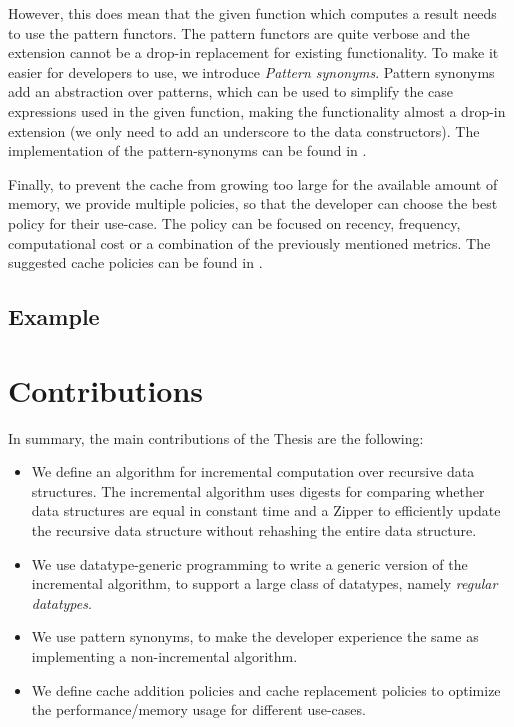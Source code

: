 However, this does mean that the given function which computes a result needs to use the pattern functors. The pattern functors are quite verbose and the extension cannot be a drop-in replacement for existing functionality. To make it easier for developers to use, we introduce \textit{Pattern synonyms}\cite*{pickering2016pattern}. Pattern synonyms add an abstraction over patterns, which can be used to simplify the case expressions used in the given function, making the functionality almost a drop-in extension (we only need to add an underscore to the data constructors). The implementation of the pattern-synonyms can be found in .

Finally, to prevent the cache from growing too large for the available amount of memory, we provide multiple policies, so that the developer can choose the best policy for their use-case. The policy can be focused on recency, frequency, computational cost or a combination of the previously mentioned metrics. The suggested cache policies can be found in .

\subsection*{Example}


\section{Contributions}

In summary, the main contributions of the Thesis are the following:

\begin{itemize}
    \item We define an algorithm for incremental computation over recursive data structures. The incremental algorithm uses digests for comparing whether data structures are equal in constant time and a Zipper to efficiently update the recursive data structure without rehashing the entire data structure.
    \item We use datatype-generic programming to write a generic version of the incremental algorithm, to support a large class of datatypes, namely \textit{regular datatypes}.
    \item We use pattern synonyms, to make the developer experience the same as implementing a non-incremental algorithm.
    \item We define cache addition policies and cache replacement policies to optimize the performance/memory usage for different use-cases.
\end{itemize}

